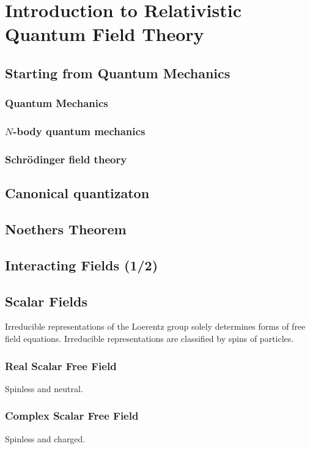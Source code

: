 \documentclass{article}
\newcommand{\qftsrcdirectory}[0]{./}
\begin{document}
\section{Introduction to Relativistic Quantum Field Theory}
\subsection{Starting from Quantum Mechanics}
\subsubsection{Quantum Mechanics}

\subsubsection{$N$-body quantum mechanics}

\subsubsection{Schr\"odinger field theory}

\subsection{Canonical quantizaton}

\subsection{Noethers Theorem}

\subsection{Interacting Fields (1/2)}


\subsection{Scalar Fields}
Irreducible representations of the Loerentz group solely 
determines forms of free field equations.
Irreducible representations are classified by
spins of particles.
\subsubsection{Real Scalar Free Field}
Spinless and neutral.

\subsubsection{Complex Scalar Free Field}
Spinless and charged.

\end{document}
